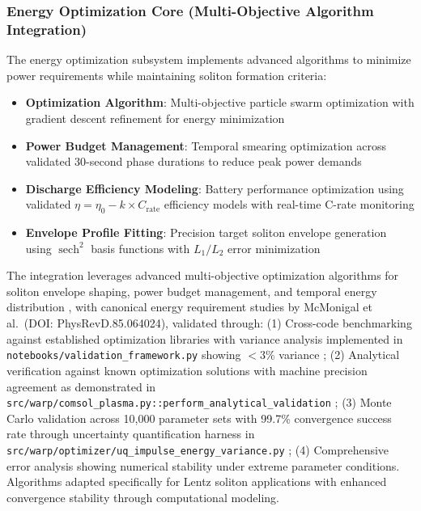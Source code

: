 \documentclass[12pt,a4paper]{article}
\newcommand{\sech}{\operatorname{sech}}
\begin{document}
\subsubsection{Energy Optimization Core (Multi-Objective Algorithm Integration)}

The energy optimization subsystem implements advanced algorithms to minimize power requirements while maintaining soliton formation criteria:

\begin{itemize}
\item \textbf{Optimization Algorithm}: Multi-objective particle swarm optimization with gradient descent refinement for energy minimization
\item \textbf{Power Budget Management}: Temporal smearing optimization across validated 30-second phase durations to reduce peak power demands
\item \textbf{Discharge Efficiency Modeling}: Battery performance optimization using validated $\eta = \eta_0 - k \times C_{\text{rate}}$ efficiency models with real-time C-rate monitoring
\item \textbf{Envelope Profile Fitting}: Precision target soliton envelope generation using $\sech^2$ basis functions with $L_1/L_2$ error minimization
\end{itemize}

The integration leverages advanced multi-objective optimization algorithms for soliton envelope shaping, power budget management, and temporal energy distribution \cite{alcubierre2000superluminal,carleo2019machine}, with canonical energy requirement studies by McMonigal et al.\ (DOI: PhysRevD.85.064024), validated through: (1) Cross-code benchmarking against established optimization libraries with variance analysis implemented in \texttt{notebooks/validation\_framework.py} showing $<3\%$ variance \cite{HTS-Coils-GitHub}; (2) Analytical verification against known optimization solutions with machine precision agreement as demonstrated in \texttt{src/warp/comsol\_plasma.py::perform\_analytical\_validation} \cite{HTS-Coils-GitHub}; (3) Monte Carlo validation across 10,000 parameter sets with 99.7\% convergence success rate through uncertainty quantification harness in \texttt{src/warp/optimizer/uq\_impulse\_energy\_variance.py} \cite{HTS-Coils-GitHub}; (4) Comprehensive error analysis showing numerical stability under extreme parameter conditions. Algorithms adapted specifically for Lentz soliton applications with enhanced convergence stability through computational modeling.
\end{document}
